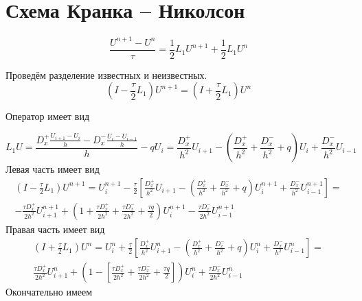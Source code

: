 \documentclass[a4paper,12pt]{article}
\begin{document}
\renewcommand{\contentsname}{Содержание}
\renewcommand{\figurename}{Рис.}
\renewcommand{\bibname}{Список литературы}
\renewcommand{\refname}{Список литературы}
\renewcommand{\tablename}{Таблица}


\section{Схема Кранка -- Николсон}
\begin{equation}
  \label{eq:Crank-Nicolson}
    \frac{U^{n+1} - U^n}{\tau} = \frac{1}{2} L_1 U^{n+1}  + \frac{1}{2} L_1 U^n 
\end{equation}

Проведём разделение известных и неизвестных.
\begin{equation}
    \left( I - \frac{\tau}{2} L_1 \right) U^{n+1} = \left( I + \frac{\tau}{2} L_1 \right) U^n 
\end{equation}

Оператор имеет вид

\begin{equation*}
  L_1 U = \frac{D^+_x \frac{U_{i+1} - U_{i}}{h} - D^-_x\frac{U_{i} - U_{i-1}}{h}}{h}  - qU_{i} = \frac{D^+_x}{h^2}U_{i+1} - \left( \frac{D^+_x}{h^2} + \frac{D^-_x}{h^2} + q \right)U_{i} +  \frac{D^-_x}{h^2}U_{i-1}
\end{equation*}
Левая часть имеет вид
\begin{multline*}
    \left( I - \frac{\tau}{2} L_1 \right) U^{n+1} = U^{n+1}_i - \frac{\tau}{2} \left[ \frac{D^+_x}{h^2}U_{i+1} - \left( \frac{D^+_x}{h^2} + \frac{D^-_x}{h^2} + q \right) U^{n+1}_{i} +  \frac{D^-_x}{h^2}U^{n+1}_{i-1} \right] = \\
    - \frac{\tau D^+_x}{2h^2}U^{n+1}_{i+1} + \left(1 + \frac{\tau D^+_x}{2 h^2} + \frac{\tau D^-_x}{2 h^2} + \frac{\tau q}{2} \right) U^{n+1}_{i} - \frac{\tau D^-_x}{2h^2}U^{n+1}_{i-1}
\end{multline*}
Правая часть имеет вид
\begin{multline*}
    \left( I + \frac{\tau}{2} L_1 \right) U^{n} = U^{n}_i + \frac{\tau}{2} \left[ \frac{D^+_x}{h^2}U^{n}_{i+1} - \left( \frac{D^+_x}{h^2} + \frac{D^-_x}{h^2} + q \right) U^{n}_{i} +  \frac{D^-_x}{h^2}U^{n}_{i-1} \right] = \\
    \frac{\tau D^+_x}{2h^2}U^{n}_{i+1} + \left(1 - \left[\frac{\tau D^+_x}{2 h^2} + \frac{\tau D^-_x}{2 h^2} + \frac{\tau q}{2} \right] \right) U^{n}_{i} + \frac{\tau D^-_x}{2h^2}U^{n}_{i-1}
\end{multline*}
Окончательно имеем
\end{document}
